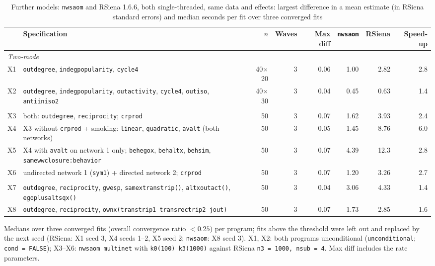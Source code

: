 \begin{table}[htbp]
\centering
\caption{Further models: \texttt{nwsaom} and RSiena 1.6.6, both single-threaded, same data and effects:
largest difference in a mean estimate (in RSiena standard errors) and median seconds per fit over three converged fits}
\label{tab:benchextra}
\footnotesize
\begin{tabular}{l>{\raggedright\arraybackslash}p{}rrrrrr}
\toprule
 & Specification & $n$ & Waves & Max diff & \texttt{nwsaom} & RSiena & Speed-up \\
\midrule
\multicolumn{8}{l}{\textit{Two-mode}} \\
X1 & \texttt{outdegree}, \texttt{indegpopularity}, \texttt{cycle4} & 40$\times$20 & 3 & 0.06 & 1.00 & 2.82 & 2.8 \\
X2 & \texttt{outdegree}, \texttt{indegpopularity}, \texttt{outactivity}, \texttt{cycle4}, \texttt{outiso}, \texttt{antiiniso2} & 40$\times$30 & 3 & 0.04 & 0.45 & 0.63 & 1.4 \\
\addlinespace
\multicolumn{8}{l}{\textit{Two networks}} \\
X3 & both: \texttt{outdegree}, \texttt{reciprocity}; \texttt{crprod} & 50 & 3 & 0.07 & 1.62 & 3.93 & 2.4 \\
X4 & X3 without \texttt{crprod} + smoking: \texttt{linear}, \texttt{quadratic}, \texttt{avalt} (both networks) & 50 & 3 & 0.05 & 1.45 & 8.76 & 6.0 \\
X5 & X4 with \texttt{avalt} on network 1 only; \texttt{behegox}, \texttt{behaltx}, \texttt{behsim}, \texttt{samewwclosure:behavior} & 50 & 3 & 0.07 & 4.39 & 12.3 & 2.8 \\
X6 & undirected network 1 (\texttt{sym1}) + directed network 2; \texttt{crprod} & 50 & 3 & 0.07 & 1.20 & 3.26 & 2.7 \\
\addlinespace
\multicolumn{8}{l}{\textit{Single network}} \\
X7 & \texttt{outdegree}, \texttt{reciprocity}, \texttt{gwesp}, \texttt{samextranstrip()}, \texttt{altxoutact()}, \texttt{egoplusaltsqx()} & 50 & 3 & 0.04 & 3.06 & 4.33 & 1.4 \\
X8 & \texttt{outdegree}, \texttt{reciprocity}, \texttt{ownx(transtrip1 transrectrip2 jout)} & 50 & 3 & 0.07 & 1.73 & 2.85 & 1.6 \\
\bottomrule
\end{tabular}
\par\smallskip\footnotesize Medians over three converged fits (overall convergence ratio $<0.25$) per program; fits above the threshold were left out and replaced by the next seed (RSiena: X1 seed 3, X4 seeds 1--2, X5 seed 2; \texttt{nwsaom}: X8 seed 3). X1, X2: both programs unconditional (\texttt{unconditional}; \texttt{cond = FALSE}); X3--X6: \texttt{nwsaom multinet} with \texttt{k0(100) k3(1000)} against RSiena \texttt{n3 = 1000, nsub = 4}. Max diff includes the rate parameters.
\end{table}
